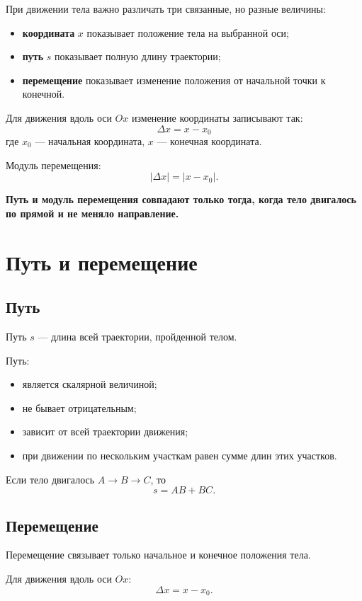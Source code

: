 \documentclass[a4paper,12pt]{article}
\newcommand{\key}[1]{\textbf{\color{darkaccent}#1}}
\newcommand{\important}[1]{\textbf{#1}}
\begin{document}
При движении тела важно различать три связанные, но разные величины:

\begin{itemize}
  \item \key{координата} \(x\) показывает положение тела на выбранной оси;
  \item \key{путь} \(s\) показывает полную длину траектории;
  \item \key{перемещение} показывает изменение положения от начальной точки к конечной.
\end{itemize}

Для движения вдоль оси \(Ox\) изменение координаты записывают так:
\[
\boxed{\Delta x=x-x_0}
\]
где \(x_0\) --- начальная координата, \(x\) --- конечная координата.

Модуль перемещения:
\[
\boxed{|\Delta x|=|x-x_0|}.
\]

\important{Путь и модуль перемещения совпадают только тогда, когда тело двигалось по прямой и не меняло направление.}

\section{Путь и перемещение}

\subsection{Путь}

Путь \(s\) --- длина всей траектории, пройденной телом.

Путь:

\begin{itemize}
  \item является скалярной величиной;
  \item не бывает отрицательным;
  \item зависит от всей траектории движения;
  \item при движении по нескольким участкам равен сумме длин этих участков.
\end{itemize}

Если тело двигалось \(A\to B\to C\), то
\[
s=AB+BC.
\]

\subsection{Перемещение}

Перемещение связывает только начальное и конечное положения тела.

Для движения вдоль оси \(Ox\):
\[
\Delta x=x-x_0.
\]
\end{document}
